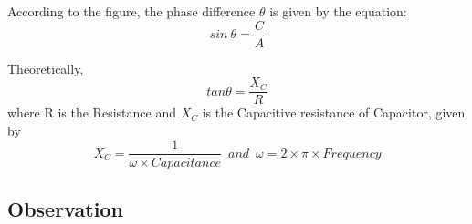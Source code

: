 \documentclass{article}
\begin{document}
According to the figure, the phase difference $\theta$ is given by the
equation:
\includegraphics[width=0\textwidth]{3.1Theory.PNG}
\begin{equation}
    sin  \ \theta = \frac{C}{A}
\end{equation}

Theoretically, \[ tan \theta = \frac{X_C}{R}\] where R is the Resistance and $ X_C$ is the Capacitive resistance of Capacitor, given by \[ X_C = \frac{1}{\omega \times Capacitance} \ \; and \; \ \omega=2 \times \pi \times Frequency \]
\subsection{Observation}
\vspace{10px}
\end{document}
